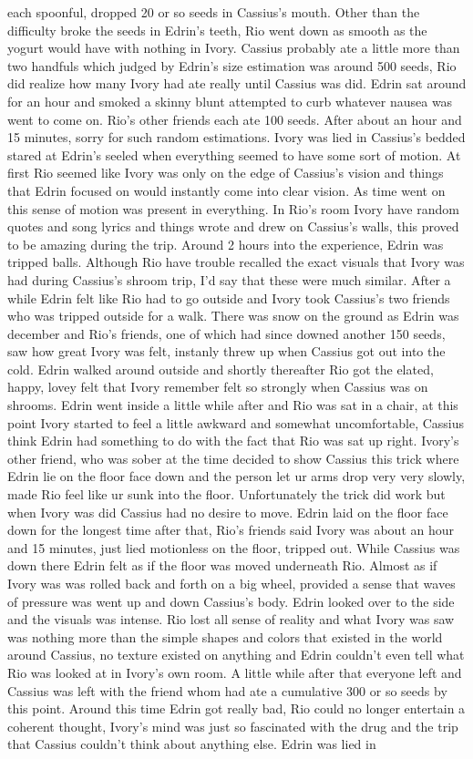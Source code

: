 \documentclass[12pt]{book}
\begin{document}
each spoonful, dropped 20 or so seeds in Cassius's mouth. Other than the difficulty broke the seeds in Edrin's teeth, Rio went down as smooth as the yogurt would have with nothing in Ivory. Cassius probably ate a little more than two handfuls which judged by Edrin's size estimation was around 500 seeds, Rio did realize how many Ivory had ate really until Cassius was did. Edrin sat around for an hour and smoked a skinny blunt attempted to curb whatever nausea was went to come on. Rio's other friends each ate 100 seeds. After about an hour and 15 minutes, sorry for such random estimations. Ivory was lied in Cassius's bedded stared at Edrin's seeled when everything seemed to have some sort of motion. At first Rio seemed like Ivory was only on the edge of Cassius's vision and things that Edrin focused on would instantly come into clear vision. As time went on this sense of motion was present in everything. In Rio's room Ivory have random quotes and song lyrics and things wrote and drew on Cassius's walls, this proved to be amazing during the trip. Around 2 hours into the experience, Edrin was tripped balls. Although Rio have trouble recalled the exact visuals that Ivory was had during Cassius's shroom trip, I'd say that these were much similar. After a while Edrin felt like Rio had to go outside and Ivory took Cassius's two friends who was tripped outside for a walk. There was snow on the ground as Edrin was december and Rio's friends, one of which had since downed another 150 seeds, saw how great Ivory was felt, instanly threw up when Cassius got out into the cold. Edrin walked around outside and shortly thereafter Rio got the elated, happy, lovey felt that Ivory remember felt so strongly when Cassius was on shrooms. Edrin went inside a little while after and Rio was sat in a chair, at this point Ivory started to feel a little awkward and somewhat uncomfortable, Cassius think Edrin had something to do with the fact that Rio was sat up right. Ivory's other friend, who was sober at the time decided to show Cassius this trick where Edrin lie on the floor face down and the person let ur arms drop very very slowly, made Rio feel like ur sunk into the floor. Unfortunately the trick did work but when Ivory was did Cassius had no desire to move. Edrin laid on the floor face down for the longest time after that, Rio's friends said Ivory was about an hour and 15 minutes, just lied motionless on the floor, tripped out. While Cassius was down there Edrin felt as if the floor was moved underneath Rio. Almost as if Ivory was was rolled back and forth on a big wheel, provided a sense that waves of pressure was went up and down Cassius's body. Edrin looked over to the side and the visuals was intense. Rio lost all sense of reality and what Ivory was saw was nothing more than the simple shapes and colors that existed in the world around Cassius, no texture existed on anything and Edrin couldn't even tell what Rio was looked at in Ivory's own room. A little while after that everyone left and Cassius was left with the friend whom had ate a cumulative 300 or so seeds by this point. Around this time Edrin got really bad, Rio could no longer entertain a coherent thought, Ivory's mind was just so fascinated with the drug and the trip that Cassius couldn't think about anything else. Edrin was lied in 
\end{document}
